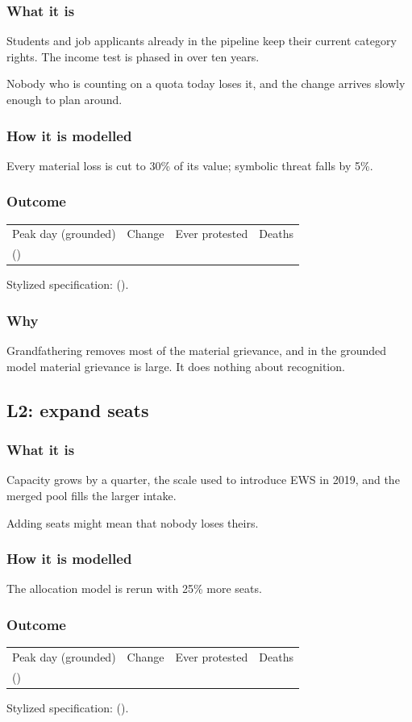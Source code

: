 \documentclass[11pt,a4paper]{article}
\makeatletter
\newcommand{\outcomeline}[6]{%
  \begin{tabular}{@{}llll@{}}
  \sffamily\small\color{muted}Peak day (grounded) & \sffamily\small\color{muted}Change & \sffamily\small\color{muted}Ever protested & \sffamily\small\color{muted}Deaths\\
  \textbf{#1} \small(#2) & \textbf{#3} & #4 & #5\\
  \end{tabular}\par\smallskip
  {\small\color{muted}Stylized specification: #6}\par}
\makeatother
\begin{document}
\subsubsection{What it is}
Students and job applicants already in the pipeline keep their current category rights. The income test is phased in over ten years.
\begin{plainwords}Nobody who is counting on a quota today loses it, and the change arrives slowly enough to plan around.\end{plainwords}
\subsubsection{How it is modelled}
Every material loss is cut to 30\% of its value; symbolic threat falls by 5\%.
\subsubsection{Outcome}
\outcomeline{\PeakGroundedGrandfathering}{\PeakRangeGroundedGrandfathering}{\PeakChangeGroundedGrandfathering}{\CumulativeGroundedGrandfathering}{\DeathsGroundedGrandfathering}{\PeakCentralGrandfathering{} (\PeakChangeCentralGrandfathering).}
\subsubsection{Why}
Grandfathering removes most of the material grievance, and in the grounded model material grievance is large. It does nothing about recognition.

\subsection{L2: expand seats}
\subsubsection{What it is}
Capacity grows by a quarter, the scale used to introduce EWS in 2019, and the merged pool fills the larger intake.
\begin{plainwords}Adding seats might mean that nobody loses theirs.\end{plainwords}
\subsubsection{How it is modelled}
The allocation model is rerun with 25\% more seats.
\subsubsection{Outcome}
\outcomeline{\PeakGroundedSeatExpansion}{\PeakRangeGroundedSeatExpansion}{\PeakChangeGroundedSeatExpansion}{\CumulativeGroundedSeatExpansion}{\DeathsGroundedSeatExpansion}{\PeakCentralSeatExpansion{} (\PeakChangeCentralSeatExpansion).}
\end{document}
